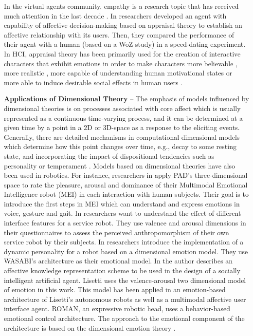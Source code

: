 \documentclass[12pt]{report}
\begin{document}
In the virtual agents community, empathy is a research topic that has received
much attention in the last decade \cite{brave:emotion-hci}
\cite{scott:modeling-empathy-agent} \cite{paiva:agent-care}
\cite{prendinger:empathic-companion} \cite{bickmore:longterm-relationship}. In
\cite{pontier:women-robot-men} researchers developed an agent with capability of
affective decision-making based on appraisal theory to establish an affective
relationship with its users. Then, they compared the performance of their agent
with a human (based on a WoZ study) in a speed-dating experiment. In HCI,
appraisal theory has been primarily used for the creation of interactive
characters that exhibit emotions in order to make characters more believable
\cite{neal:believable-agents}, more realistic \cite{mao:social-causality}
\cite{traum:negotiation-teams-training}, more capable of understanding human
motivational states \cite{conati:evaluating-student-affect} or more able to
induce desirable social effects in human users \cite{paiva:learning-feeling}.

\textbf{Applications of Dimensional Theory} -- The emphasis of models influenced
by dimensional theories is on processes associated with core affect which is
usually represented as a continuous time-varying process, and it can be
determined at a given time by a point in a 2D or 3D-space as a response to the
eliciting events. Generally, there are detailed mechanisms in computational
dimensional models which determine how this point changes over time, e.g., decay
to some resting state, and incorporating the impact of dispositional tendencies
such as personality or temperament \cite{gebhard:alma}
\cite{marsella:computational-models}. Models based on dimensional theories have
also been used in robotics. For instance, researchers in
\cite{lim:mei-motherese-ei} apply PAD's three-dimensional space to rate the
pleasure, arousal and dominance of their Multimodal Emotional Intelligence robot
(MEI) in each interaction with human subjects. Their goal is to introduce the
first steps in MEI which can understand and express emotions in voice, gesture
and gait. In \cite{zhang:service-robot-dimensional} researchers want to
understand the effect of different interface features for a service robot. They
use valence and arousal dimensions in their questionnaires to assess the
perceived anthropomorphism of their own service robot by their subjects. In
\cite{klug:emotion-based-hri} researchers introduce the implementation of a
dynamic personality for a robot based on a dimensional emotion model. They use
WASABI's architecture \cite{becker:wasabi,becker:wasabi-description} as their
emotional model. In \cite{lisetti:affect-socially-intelligent} the author
describes an affective knowledge representation scheme to be used in the design
of a socially intelligent artificial agent. Lisetti uses the valence-arousal two
dimensional model of emotion in this work. This model has been applied in an
emotion-based architecture of Lisetti's autonomous robots as well as a
multimodal affective user interface agent. ROMAN, an expressive robotic head,
uses a behavior-based emotional control architecture. The approach to the
emotional component of the architecture is based on the dimensional emotion
theory \cite{hirth:roman}.
\end{document}

